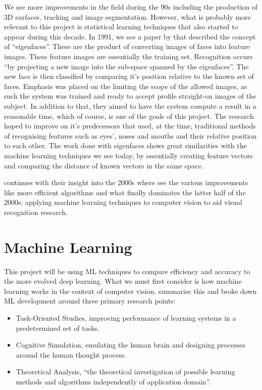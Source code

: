 \documentclass[12pt,a4paper]{report}
\begin{document}
We see more improvements in the field during the 90s including the production of 3D surfaces, tracking and image 
segmentation. However, what is probably more relevant to this project is statistical learning techniques that also 
started to appear during this decade. In 1991, we see a paper by \citet{turk1991face} that described
the concept of “eigenfaces”. These are the product of converting images of faces into feature images. These feature 
images are essentially the training set. Recognition occurs “by projecting a new image into the sub-space spanned by 
the eigenfaces”. The new face is then classified by comparing it's position relative to the known set of faces. 
Emphasis was placed on the limiting the scope of the allowed images, as such the system was trained and ready to 
accept profile straight-on images of the subject. In addition to that, they aimed to have the system compute a result
in a reasonable time, which of course, is one of the goals of this project. The research hoped to improve on it's 
predecessors that used, at the time, traditional methods of recognising features such as eyes', noses and mouths and 
their relative position to each other. The work done with eigenfaces shows great similarities with the machine 
learning techniques we see today, by essentially creating feature vectors and comparing the distance of known 
vectors in the same space.

\par

\citet{SzeliskiRichard2011CV:A} continues with their insight into the 2000s where see the various 
improvements like more efficient algorithms and what finally dominates the latter half of the 2000s; applying machine 
learning techniques to computer vision to aid visual recognition research.

\section{Machine Learning}

This project will be using ML techniques to compare efficiency and accuracy to the more evolved deep learning. 
What we must first consider is how machine learning works in the context of computer vision. 
\citet{CamastraFrancescoMLfA} summarise this and broke down ML development around three primary research 
points:

\begin{itemize}
    \item Task-Oriented Studies, improving performance of learning systems in a predetermined set of tasks.
    \item Cognitive Simulation, emulating the human brain and designing processes around the human thought process.
    \item Theoretical Analysis, “the theoretical investigation of possible learning methods and algorithms 
    independently of application domain”.
\end{itemize}
\end{document}
